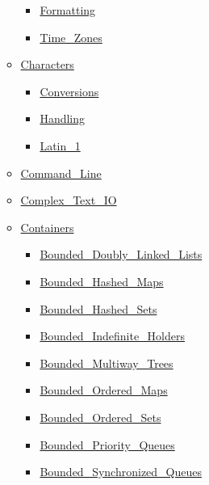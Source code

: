 \documentclass[english]{article}
\begin{document}
\begin{scriptsize}
\begin{multicols*}{5}
\begin{itemize}[leftmargin=0mm]
\begin{itemize}[leftmargin=5mm]
\begin{itemize}[leftmargin=5mm]
	\item[] \href{http://www.ada-auth.org/standards/22rm/html/RM-9-6-1.html}{Formatting}
	\item[] \href{http://www.ada-auth.org/standards/22rm/html/RM-9-6-1.html}{Time\_Zones}
	\end{itemize}
  \item[] \href{http://www.ada-auth.org/standards/22rm/html/RM-A-3-1.html}{Characters}
	\begin{itemize}[leftmargin=5mm]
	\item[] \href{http://www.ada-auth.org/standards/22rm/html/RM-A-3-4.html}{Conversions}
	\item[] \href{http://www.ada-auth.org/standards/22rm/html/RM-A-3-2.html}{Handling}
	\item[] \href{http://www.ada-auth.org/standards/22rm/html/RM-A-3-3.html}{Latin\_1}
	\end{itemize}
  \item[] \href{http://www.ada-auth.org/standards/22rm/html/RM-A-15.html}{Command\_Line}
  \item[] \href{http://www.ada-auth.org/standards/22rm/html/RM-G-1-3.html}{Complex\_Text\_IO}
  \item[] \href{http://www.ada-auth.org/standards/22rm/html/RM-A-18-1.html}{Containers}
	\begin{itemize}[leftmargin=5mm]
	\item[] \href{http://www.ada-auth.org/standards/22rm/html/RM-A-18-20.html}{Bounded\_Doubly\_Linked\_Lists}
	\item[] \href{http://www.ada-auth.org/standards/22rm/html/RM-A-18-21.html}{Bounded\_Hashed\_Maps}
	\item[] \href{http://www.ada-auth.org/standards/22rm/html/RM-A-18-23.html}{Bounded\_Hashed\_Sets}
	\item[] \href{http://www.ada-auth.org/standards/22rm/html/RM-A-18-32.html}{Bounded\_Indefinite\_Holders}
	\item[] \href{http://www.ada-auth.org/standards/22rm/html/RM-A-18-25.html}{Bounded\_Multiway\_Trees}
	\item[] \href{http://www.ada-auth.org/standards/22rm/html/RM-A-18-22.html}{Bounded\_Ordered\_Maps}
	\item[] \href{http://www.ada-auth.org/standards/22rm/html/RM-A-18-24.html}{Bounded\_Ordered\_Sets}
	\item[] \href{http://www.ada-auth.org/standards/22rm/html/RM-A-18-31.html}{Bounded\_Priority\_Queues}
	\item[] \href{http://www.ada-auth.org/standards/22rm/html/RM-A-18-29.html}{Bounded\_Synchronized\_Queues}

\end{itemize}
\end{itemize}
\end{itemize}
\end{multicols*}
\end{scriptsize}
\end{document}
